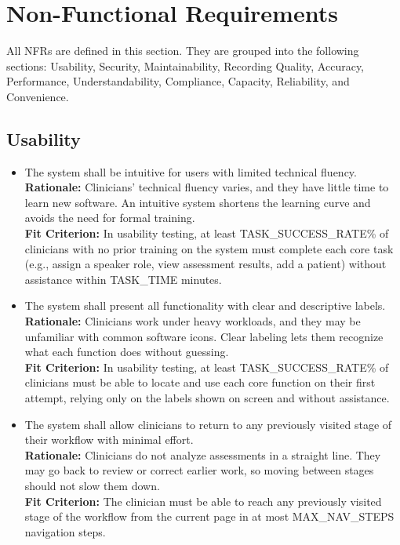 \documentclass[12pt]{article}
\newcounter{nfrnum} %
\newcommand{\rthenfrnum}{NFR\thenfrnum}
\begin{document}
\section{Non-Functional Requirements} \label{sec:NFR}
All NFRs are defined in this section. They are grouped into the following sections: Usability, Security, Maintainability, Recording Quality, Accuracy, Performance, Understandability, Compliance, Capacity, Reliability, and Convenience.

\subsection{Usability}

\noindent \begin{itemize}

\item[\textbf{\rthenfrnum}:]
\label{NFR-U1}
  The system shall be intuitive for users with limited technical fluency.
  \\ \textbf{Rationale:} Clinicians’ technical fluency varies, and they have little time to learn new software. An intuitive system shortens the learning curve and avoids the need for formal training.
  \\ \textbf{Fit Criterion:} In usability testing, at least TASK\_SUCCESS\_RATE\% of clinicians with no prior training on the system must complete each core task (e.g., assign a speaker role, view assessment results, add a patient) without assistance within TASK\_TIME minutes.

\item[\textbf{\rthenfrnum}:]
\label{NFR-U2}
  The system shall present all functionality with clear and descriptive labels.
  \\ \textbf{Rationale:} Clinicians work under heavy workloads, and they may be unfamiliar with common software icons. Clear labeling lets them recognize what each function does without guessing.
  \\ \textbf{Fit Criterion:} In usability testing, at least TASK\_SUCCESS\_RATE\% of clinicians must be able to locate and use each core function on their first attempt, relying only on the labels shown on screen and without assistance.

\item[\textbf{\rthenfrnum}:]
\label{NFR-U3}
  The system shall allow clinicians to return to any previously visited stage of their workflow with minimal effort.
  \\ \textbf{Rationale:} Clinicians do not analyze assessments in a straight line. They may go back to review or correct earlier work, so moving between stages should not slow them down.
  \\ \textbf{Fit Criterion:} The clinician must be able to reach any previously visited stage of the workflow from the current page in at most MAX\_NAV\_STEPS navigation steps.


\end{itemize}
\end{document}
